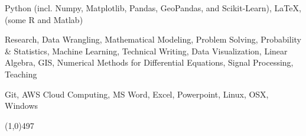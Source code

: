 \documentclass[10pt]{article} %
\begin{document}
 Python (incl. Numpy, Matplotlib, Pandas, GeoPandas, and Scikit-Learn), \LaTeX, (some R and Matlab)

Research, Data Wrangling, Mathematical Modeling, Problem Solving, Probability \& Statistics, Machine Learning, Technical Writing, Data Visualization, Linear Algebra,
GIS, Numerical Methods for Differential Equations, Signal Processing, Teaching


Git, AWS Cloud Computing, MS Word, Excel, Powerpoint, Linux, OSX, Windows


\vspace{-2mm}
\noindent
\line(1,0){497}\\
\vspace{-3.5mm}

\end{document}

